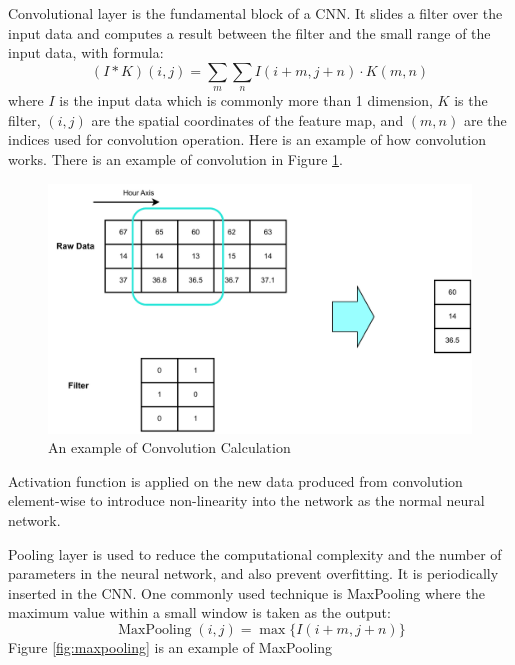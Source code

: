 \documentclass[12pt,a4paper,english
]{tunithesis}
\begin{document}
Convolutional layer is the fundamental block of a CNN. It slides a filter over the input data and computes a result between the filter and the small range of the input data, with formula:
\begin{equation}
    (I * K)(i, j)=\sum_m \sum_n I(i+m, j+n) \cdot K(m, n)
\end{equation}
where $I$ is the input data which is commonly more than 1 dimension, $K$ is the filter, $(i, j)$ are the spatial coordinates of the feature map, and $(m, n)$ are the indices used for convolution operation. Here is an example of how convolution works. There is an example of convolution in Figure \ref{fig:convolution}.

\begin{figure}
  \begin{center}
    \includegraphics[width=1\textwidth]{thesis/img/convolution.pdf}
  \end{center}
  \caption[Convolution]{An example of Convolution Calculation}
  \label{fig:convolution}
\end{figure}

Activation function is applied on the new data produced from convolution element-wise to introduce non-linearity into the network as the normal neural network.

Pooling layer is used to reduce the computational complexity and the number of parameters in the neural network, and also prevent overfitting. It is periodically inserted in the CNN. One commonly used technique is MaxPooling where the maximum value within a small window is taken as the output:
\begin{equation}
    \operatorname{MaxPooling}(i, j)=\max \{I(i+m, j+n)\}
\end{equation}
Figure \ref{fig:maxpooling} is an example of MaxPooling
\end{document}
